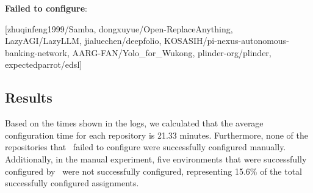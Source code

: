 \textbf{Failed to configure}:

[zhuqinfeng1999/Samba, dongxuyue/Open-ReplaceAnything, LazyAGI/LazyLLM, jialuechen/deepfolio, KOSASIH/pi-nexus-autonomous-banking-network, AARG-FAN/Yolo\_for\_Wukong, plinder-org/plinder, expectedparrot/edsl]

\subsection{Results}
Based on the times shown in the logs, we calculated that the average configuration time for each repository is 21.33 minutes. Furthermore, none of the repositories that \tool~failed to configure were successfully configured manually. Additionally, in the manual experiment, five environments that were successfully configured by \tool~were not successfully configured, representing 15.6\% of the total successfully configured assignments.

